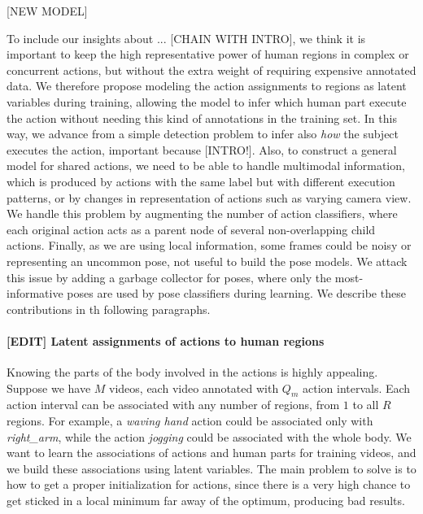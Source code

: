 [NEW MODEL]

To include our insights about ... [CHAIN WITH INTRO], we think it is important to keep the high representative power of human regions in complex or concurrent actions, but without the extra weight of requiring expensive annotated data. We therefore propose modeling the action assignments to regions as latent variables during training, allowing the model to infer which human part execute the action without needing this kind of annotations in the training set. In this way, we advance from a simple detection problem to infer also \emph{how} the subject executes the action, important because [INTRO!]. Also, to construct a general model for shared actions, we need to be able to handle multimodal information, which is produced by actions with the same label but with different execution patterns, or by changes in representation of actions such as varying camera view. We handle this problem by augmenting the number of action classifiers, where each original action acts as a parent node of several non-overlapping child actions. Finally, as we are using local information, some frames could be noisy or representing an uncommon pose, not useful to build the pose models. We attack this issue by adding a garbage collector for poses, where only the most-informative poses are used by pose classifiers during learning. We describe these contributions in th following paragraphs.

\paragraph{[EDIT] Latent assignments of actions to human regions}

Knowing the parts of the body involved in the actions is highly appealing. Suppose we have $M$ videos, each video annotated with $Q_m$ action intervals. Each action interval can be associated with any number of regions, from $1$ to all $R$ regions. For example,  a \emph{waving hand} action could be associated only with \emph{right\_arm}, while the action \emph{jogging} could be associated with the whole body. We want to learn the associations of actions and human parts for training videos, and we build these associations using latent variables. The main problem to solve is to how to get a proper initialization for actions, since there is a very high chance to get sticked in a local minimum far away of the optimum, producing bad results.

